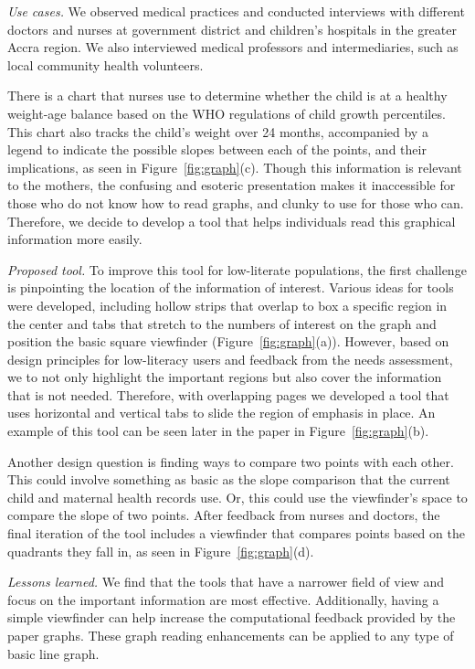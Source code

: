 \documentclass{sig-alternate}
\begin{document}
\emph{Use cases.}
We observed medical practices and conducted interviews with different doctors and nurses at government district and children's hospitals in the greater Accra region. We also interviewed medical professors and intermediaries, such as local community health volunteers. 

There is a chart that nurses use to determine whether the child is at a healthy weight-age balance based on the WHO regulations of child growth percentiles. This chart also tracks the child's weight over 24 months, accompanied by a legend to indicate the possible slopes between each of the points, and their implications, as seen in Figure~\ref{fig:graph}(c). Though this information is relevant to the mothers, the confusing and esoteric presentation makes it inaccessible for those who do not know how to read graphs, and clunky to use for those who can. Therefore, we decide to develop a tool that helps individuals read this graphical information more easily.

\emph{Proposed tool.}
To improve this tool for low-literate populations, the first challenge is pinpointing the location of the information of interest. Various ideas for tools were developed, including hollow strips that overlap to box a specific region in the center and tabs that stretch to the numbers of interest on the graph and position the basic square viewfinder (Figure~\ref{fig:graph}(a)). However, based on design principles for low-literacy users and feedback from the needs assessment, we to not only highlight the important regions but also cover the information that is not needed. Therefore, with overlapping pages we developed a tool that uses horizontal and vertical tabs to slide the region of emphasis in place. An example of this tool can be seen later in the paper in Figure~\ref{fig:graph}(b).

Another design question is finding ways to compare two points with each other. This could involve something as basic as the slope comparison that the current child and maternal health records use. Or, this could use the viewfinder's space to compare the slope of two points. After feedback from nurses and doctors, the final iteration of the tool includes a viewfinder that compares points based on the quadrants they fall in, as seen in Figure~\ref{fig:graph}(d).

\emph{Lessons learned.}
We find that the tools that have a narrower field of view and focus on the important information are most effective. Additionally, having a simple viewfinder can help increase the computational feedback provided by the paper graphs. 
These graph reading enhancements can be applied to any type of basic line graph. 
\end{document}
